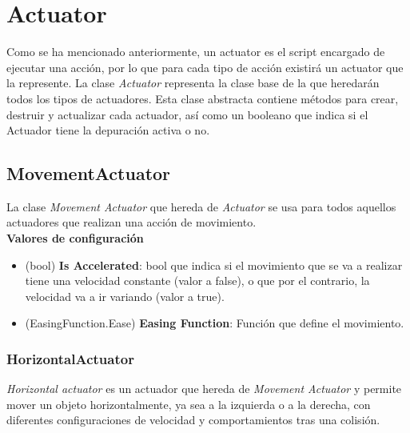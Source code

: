 \section{Actuator}

Como se ha mencionado anteriormente, un actuator es el script encargado de ejecutar una acción, por lo que para cada tipo de acción existirá un actuator que la represente.
La clase \textit{Actuator} representa la clase base de la que heredarán todos los tipos de actuadores.
Esta clase abstracta contiene métodos para crear, destruir y actualizar cada actuador, así como un booleano que indica si el Actuador tiene la depuración activa o no.\\

\subsection{MovementActuator}
La clase \textit{Movement Actuator} que hereda de \textit{Actuator} se usa para todos aquellos actuadores que realizan una acción de movimiento. \\

\textbf{Valores de configuración}
\begin{itemize}
	\item (bool) \textbf{Is Accelerated}: bool que indica si el movimiento que se va a realizar tiene una velocidad constante (valor a false), o que por el contrario, la velocidad va a ir variando (valor a true).
	\item (EasingFunction.Ease) \textbf{Easing Function}: Función que define el movimiento.
\end{itemize}

\subsubsection{HorizontalActuator}
\textit{Horizontal actuator} es un actuador que hereda de \textit{Movement Actuator} y permite mover un objeto horizontalmente, ya sea a la izquierda o a la derecha, con diferentes configuraciones de velocidad y comportamientos tras una colisión.\\

